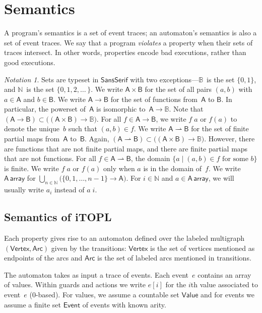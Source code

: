 \documentclass{sigplanconf} %
\newcommand{\B}{\ensuremath{\mathbb{B}}}
\newcommand{\N}{\ensuremath{\mathbb{N}}}
\newcommand{\pmap}{\rightharpoonup}
\newcommand{\set}[1]{\ensuremath{\mathsf{#1}}}
\theoremstyle{definition}
\theoremstyle{remark}
\newtheorem{notation}{Notation}
\begin{document}
\section{Semantics}\label{sec:semantics} %

A program's semantics is a set of event traces;
an automaton's semantics is also a set of event traces.
We say that a program \emph{violates} a property when their sets of traces intersect.
In other words, properties encode bad executions, rather than good executions.

\begin{notation}
Sets are typeset in \set{SansSerif} with two exceptions---$\B$~is the set $\{0,1\}$, and $\N$~is the set $\{0,1,2,\ldots\,\}$.
We write $\set A\times\set B$ for the set of all pairs $(a,b)$ with $a\in\set A$ and $b\in\set B$.
We write $\set A\to\set B$ for the set of functions from~\set A to \set B.
In particular, the powerset of~\set A is isomorphic to~$\set A\to\B$.
Note that $(\set A\to\set B)\subset\bigl((\set A\times\set B)\to\B\bigr)$.
For all $f\in\set A\to\set B$, we write $f\;a$ or $f(a)$ to denote the unique~$b$ such that $(a,b)\in f$.
We write $\set A\pmap\set B$ for the set of finite partial maps from~\set A to~\set B.
Again, $(\set A\pmap\set B)\subset\bigl((\set A\times\set B)\to\B\bigr)$.
However, there are functions that are not finite partial maps, and there are finite partial maps that are not functions.
For all $f\in\set A\pmap\set B$, the domain $\{a\mid\text{$(a,b)\in f$ for some $b$}\}$ is finite.
We write $f\;a$ or $f(a)$ only when $a$ is in the domain of~$f$.
We write $\set A\,\mathsf{array}$ for $\bigcup_{n\in\N}
\bigl(\{0,1,\ldots,n-1\}\to\set A\bigr)$.
For $i\in\N$ and $a\in\set A\,\mathsf{array}$, we will usually write $a_i$
instead of $a\;i$.
\end{notation}

\subsection{Semantics of iTOPL}\label{sec:semantics.itopl} %
Each property gives rise to an automaton defined over the labeled multigraph $(\set{Vertex}, \set{Arc})$ given by the transitions:
$\set{Vertex}$ is the set of vertices mentioned as endpoints of the arcs and $\set{Arc}$ is the set of labeled arcs mentioned in transitions.

The automaton takes as input a trace of events.
Each event~$e$ contains an array of values.
Within guards and actions we write $e[i]$ for the $i$th value associated to event~$e$ (0-based).
For values, we assume a countable set \set{Value} and for events we assume
a finite set \set{Event} of events with known arity.
\end{document}
